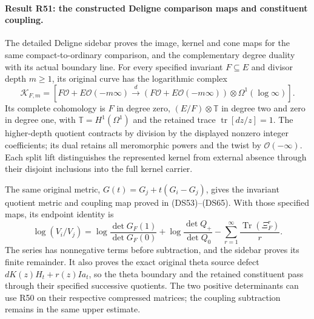 \paragraph{Result R51: the constructed Deligne comparison maps and constituent coupling.}
The detailed Deligne sidebar proves the image, kernel and cone maps
for the same compact-to-ordinary comparison, and the complementary
degree duality with its actual boundary line. For every specified
invariant \(F\subseteq E\) and divisor depth \(m\ge1\), its original
curve has the logarithmic complex
\[
 \mathscr K_{F,m}=
 [F\mathcal O+E\mathcal O(-m\infty)
   \xrightarrow d(F\mathcal O+E\mathcal O(-m\infty))
                       \otimes\Omega^1(\log\infty)].
\]
Its complete cohomology is \(F\) in degree zero,
\((E/F)\otimes\mathbb T\) in degree two and zero in degree one,
with \(\mathbb T=H^1(\Omega^1)\) and the retained trace
\(\operatorname{tr}[dz/z]=1\). The higher-depth quotient contracts
by division by the displayed nonzero integer coefficients; its
dual retains all meromorphic powers and the twist by
\(\mathcal O(-\infty)\). Each split lift distinguishes the represented
kernel from external absence through their disjoint inclusions into
the full kernel carrier.

The same original metric, \(G(t)=G_j+t(G_i-G_j)\), gives the invariant
quotient metric and coupling map proved in (DS53)--(DS65). With those
specified maps, its endpoint identity is
\[
 \log(V_i/V_j)=
 \log\frac{\det G_F(1)}{\det G_F(0)}
 +\log\frac{\det Q_+}{\det Q_0}
 -\sum_{r=1}^{\infty}\frac{\operatorname{Tr}(\Xi_F^r)}r.
\]
The series has nonnegative terms before subtraction, and the sidebar
proves its finite remainder. It also proves the exact original theta
source defect
\(dK(z)H_t+r(z)Ia_t\), so the theta boundary and the retained
constituent pass through their specified successive quotients.
The two positive determinants can use R50 on their respective
compressed matrices; the coupling subtraction remains in the same
upper estimate.


